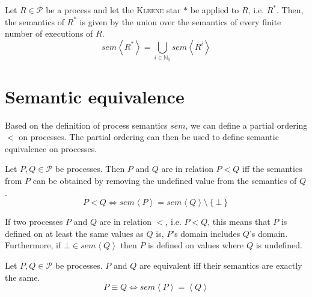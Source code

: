 \begin{definition}
\label{def:sem_kleene_alternative}
  Let $R \in \mathcal{P}$ be a process and let the \textsc{Kleene} star $*$ be applied to $R$, i.e. $R^*$. Then, the semantics of $R^*$ is given by the union over the semantics of every finite number of executions of $R$.
  \begin{equation}
    \label{eqn:sem_kleene_alternative}
    sem \left\langle R^* \right\rangle = \bigcup_{i \in \mathbb{N}_0} sem \left\langle R^i \right\rangle
  \end{equation}
  \hfill\qedsymbol
\end{definition}


\section{Semantic equivalence}
Based on the definition of process semantics $sem$, we can define a partial ordering $<$ on processes. The partial ordering can then be used to define semantic equivalence on processes.

\begin{definition}
\label{def:process_ordering}
Let $P, Q \in \mathcal{P}$ be processes. Then $P$ and $Q$ are in relation $P < Q$ iff the semantics from $P$ can be obtained by removing the undefined value from the semantics of $Q$.
  \begin{equation}
    P < Q \Leftrightarrow sem \left\langle P \right\rangle = sem \left\langle Q \right\rangle \setminus \left\{ \bot \right\}
  \end{equation}
  \hfill\qedsymbol
\end{definition}

If two processes $P$ and $Q$ are in relation $<$, i.e. $P < Q$, this means that $P$ is defined on at least the same values as $Q$ is, $P$'s domain includes $Q$'s domain. Furthermore, if $\bot \in sem \left\langle Q \right\rangle$ then $P$ is defined on values where $Q$ is undefined.

\begin{definition}
\label{def:process_equivalence}
Let $P, Q \in \mathcal{P}$ be processes. $P$ and $Q$ are equivalent iff their semantics are exactly the same.
  \begin{equation}
    \label{eqn:equivalence}
    P \equiv Q \Leftrightarrow sem \left\langle P \right\rangle = \left\langle Q \right\rangle
  \end{equation}
  \hfill\qedsymbol
\end{definition}

